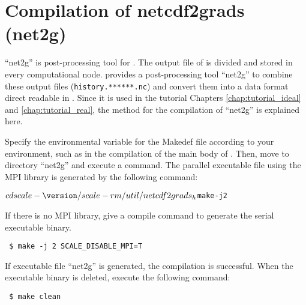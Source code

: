 \section{Compilation of netcdf2grads (net2g)} \label{sec:source_net2g}

``net2g'' is post-processing tool for \scalerm.
The output file of \scalerm is divided and stored in every computational node.
\scalelib provides a post-processing tool ``net2g''  to combine these output files
(\verb|history.******.nc|)
and convert them into a data format direct readable in \grads.
Since it is used in the tutorial Chapters \ref{chap:tutorial_ideal} and \ref{chap:tutorial_real}, the method for the compilation of ``net2g'' is explained here.

Specify the environmental variable for the Makedef file according to your environment,
such as in the compilation of the main body of \scalelib.
Then, move to directory ``net2g'' and execute a command. The parallel executable file using the MPI library is generated by the following command:
\begin{alltt}
 $ cd scale-{\version}/scale-rm/util/netcdf2grads_h
 $ make -j 2
\end{alltt}
If there is no MPI library,
give a compile command to generate the serial executable binary.
\begin{verbatim}
 $ make -j 2 SCALE_DISABLE_MPI=T
\end{verbatim}
If executable file ``net2g'' is generated, the compilation is successful.
When the executable binary is deleted, execute the following command:
\begin{verbatim}
 $ make clean
\end{verbatim}
